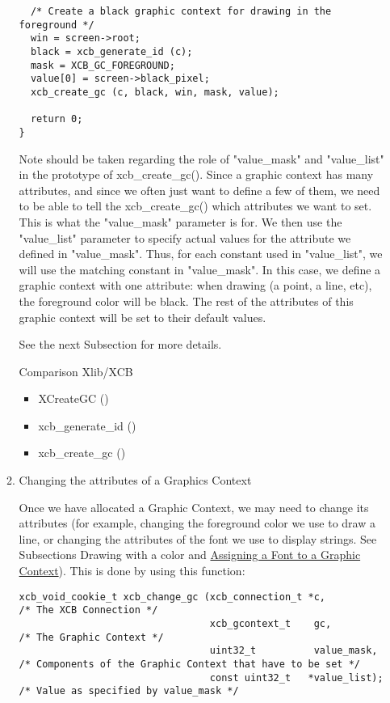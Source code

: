 \documentclass[12pt,oneside,titlepage]{book}
\providecommand{\tightlist}{%
  \setlength{\itemsep}{0pt}\setlength{\parskip}{0pt}}
\begin{document}
\begin{enumerate}
\begin{enumerate}
\begin{verbatim}
  /* Create a black graphic context for drawing in the foreground */
  win = screen->root;
  black = xcb_generate_id (c);
  mask = XCB_GC_FOREGROUND;
  value[0] = screen->black_pixel;
  xcb_create_gc (c, black, win, mask, value);

  return 0;
}
\end{verbatim}

    Note should be taken regarding the role of "value\_mask" and
    "value\_list" in the prototype of {xcb\_create\_gc()}. Since a
    graphic context has many attributes, and since we often just want to
    define a few of them, we need to be able to tell the
    {xcb\_create\_gc()} which attributes we want to set. This is what
    the "value\_mask" parameter is for. We then use the "value\_list"
    parameter to specify actual values for the attribute we defined in
    "value\_mask". Thus, for each constant used in "value\_list", we
    will use the matching constant in "value\_mask". In this case, we
    define a graphic context with one attribute: when drawing (a point,
    a line, etc), the foreground color will be black. The rest of the
    attributes of this graphic context will be set to their default
    values.

    See the next Subsection for more details.

    Comparison Xlib/XCB

    \begin{itemize}
    \tightlist
    \item
      XCreateGC ()
    \end{itemize}

    \begin{itemize}
    \tightlist
    \item
      xcb\_generate\_id ()
    \item
      xcb\_create\_gc ()
    \end{itemize}

    \hfill\break
  \item
    \protect\hypertarget{changegc}{}{Changing the attributes of a
    Graphics Context}

    Once we have allocated a Graphic Context, we may need to change its
    attributes (for example, changing the foreground color we use to
    draw a line, or changing the attributes of the font we use to
    display strings. See Subsections Drawing with a color and
    \protect\hyperlink{assigningfont}{Assigning a Font to a Graphic
    Context}). This is done by using this function:

\begin{verbatim}
xcb_void_cookie_t xcb_change_gc (xcb_connection_t *c,           /* The XCB Connection */
                                 xcb_gcontext_t    gc,          /* The Graphic Context */
                                 uint32_t          value_mask,  /* Components of the Graphic Context that have to be set */
                                 const uint32_t   *value_list); /* Value as specified by value_mask */
\end{verbatim}


\end{enumerate}
\end{enumerate}
\end{document}
